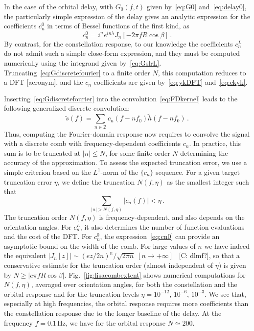 \documentclass[aps,showpacs,twocolumn,
prd,superscriptaddress,nofootinbib]{revtex4-1}
\newcommand{\be}{\begin{equation}}
\newcommand{\ee}{\end{equation}}
\newcommand{\Hz}{\,\mathrm{Hz}}
\newcommand{\SM}[1]{{\color{Red} #1}}
\begin{document}
In the case of the orbital delay, with $G_{0}(f,t)$ given by~\eqref{eq:G0} and~\eqref{eq:delay0}, the particularly simple expression of the delay gives an analytic expression for the coefficients $c_{n}^{0}$ in terms of Bessel functions of the first kind, as
\be\label{eq:cn0}
	c_{n}^{0} = i^{n} e^{i n \lambda} J_{n} \left[ -2 \pi f R \cos \beta \right]\,.
\ee
By contrast, for the constellation response, to our knowledge the coefficients $c_{n}^{L}$ do not admit such a simple close-form expression, and they must be computed numerically using the integrand given by~\eqref{eq:GslrL}. Truncating~\eqref{eq:Gdiscretefourier} to a finite order $N$, this computation reduces to a DFT \SM{[acronym]}, and the $c_{n}$ coefficients are given by~\eqref{eq:ykDFT} and~\eqref{eq:ckyk}. 

Inserting~\eqref{eq:Gdiscretefourier} into the convolution~\eqref{eq:FDkernel} leads to the following generalized discrete convolution:
\be\label{eq:transferdiscreteconvolution}
	\tilde{s}(f) = \sum_{n \in \mathbb{Z}} c_{n}(f - n f_{0}) \tilde{h} (f - n f_{0}) \,.
\ee
Thus, computing the Fourier-domain response now requires to convolve the signal with a discrete comb with frequency-dependent coefficients $c_{n}$. In practice, this sum is to be truncated at $|n|\leq N$, for some finite order $N$ determining the accuracy of the approximation. To assess the expected truncation error, we use a simple criterion based on the $L^{1}$-norm of the $\{c_{n}\}$ sequence. For a given target truncation error $\eta$, we define the truncation $N(f, \eta)$ as the smallest integer such that 
\be\label{eq:criteriontruncationcomb}
	\sum_{|n| > N(f, \eta)} |c_{n}(f)| < \eta \,.
\ee
The truncation order $N(f,\eta)$ is frequency-dependent, and also depends on the orientation angles. For $c_{n}^{L}$, it also determines the number of function evaluations and the cost of the DFT. For $c_{n}^{0}$, the expression~\eqref{eq:cn0} can provide an asymptotic bound on the width of the comb. For large values of $n$ we have indeed the equivalent $| J_{n}[z] | \sim (e z/2n)^{n}/\sqrt{2\pi n} \; \left[ n\rightarrow + \infty \right]$~\cite{} \SM{[C: dlmf?]}, so that a conservative estimate for the truncation order (almost independent of $\eta$) is given by $N \geq  |e \pi f R \cos \beta|$. Fig.~\ref{fig:lisacombextent} shows numerical computations for $N(f,\eta)$, averaged over orientation angles, for both the constellation and the orbital response and for the truncation levels  $\eta=10^{-12}$, $10^{-6}$, $10^{-3}$. We see that, especially at high frequencies, the orbital response requires more coefficients than the constellation response due to the longer baseline of the delay. At the frequency $f=0.1\Hz$, we have for the orbital response $N \simeq 200$.
\end{document}
